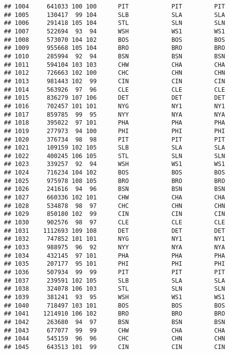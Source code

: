 \documentclass[]{article}
\begin{document}
\begin{verbatim}
## 1004     641033 100 100      PIT            PIT         PIT
## 1005     130417  99 104      SLB            SLA         SLA
## 1006     291418 105 104      STL            SLN         SLN
## 1007     522694  93  94      WSH            WS1         WS1
## 1008     573070 104 102      BOS            BOS         BOS
## 1009     955668 105 104      BRO            BRO         BRO
## 1010     285994  92  94      BSN            BSN         BSN
## 1011     594104 103 103      CHW            CHA         CHA
## 1012     726663 102 100      CHC            CHN         CHN
## 1013     981443 102  99      CIN            CIN         CIN
## 1014     563926  97  96      CLE            CLE         CLE
## 1015     836279 107 106      DET            DET         DET
## 1016     702457 101 101      NYG            NY1         NY1
## 1017     859785  99  95      NYY            NYA         NYA
## 1018     395022  97 101      PHA            PHA         PHA
## 1019     277973  94 100      PHI            PHI         PHI
## 1020     376734  98  98      PIT            PIT         PIT
## 1021     109159 102 105      SLB            SLA         SLA
## 1022     400245 106 105      STL            SLN         SLN
## 1023     339257  92  94      WSH            WS1         WS1
## 1024     716234 104 102      BOS            BOS         BOS
## 1025     975978 108 105      BRO            BRO         BRO
## 1026     241616  94  96      BSN            BSN         BSN
## 1027     660336 102 101      CHW            CHA         CHA
## 1028     534878  98  97      CHC            CHN         CHN
## 1029     850180 102  99      CIN            CIN         CIN
## 1030     902576  98  97      CLE            CLE         CLE
## 1031    1112693 109 108      DET            DET         DET
## 1032     747852 101 101      NYG            NY1         NY1
## 1033     988975  96  92      NYY            NYA         NYA
## 1034     432145  97 101      PHA            PHA         PHA
## 1035     207177  95 101      PHI            PHI         PHI
## 1036     507934  99  99      PIT            PIT         PIT
## 1037     239591 102 105      SLB            SLA         SLA
## 1038     324078 106 103      STL            SLN         SLN
## 1039     381241  93  95      WSH            WS1         WS1
## 1040     718497 103 101      BOS            BOS         BOS
## 1041    1214910 106 102      BRO            BRO         BRO
## 1042     263680  94  97      BSN            BSN         BSN
## 1043     677077  99  99      CHW            CHA         CHA
## 1044     545159  96  96      CHC            CHN         CHN
## 1045     643513 101  99      CIN            CIN         CIN

\end{verbatim}
\end{document}

